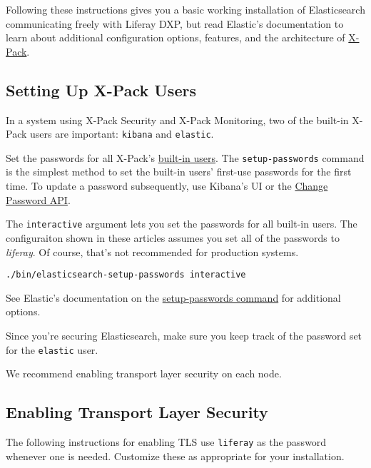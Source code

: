 Following these instructions gives you a basic working installation of
Elasticsearch communicating freely with Liferay DXP, but read Elastic's
documentation to learn about additional configuration options, features,
and the architecture of
\href{https://www.elastic.co/guide/en/elasticsearch/reference/6.5/configuring-security.html}{X-Pack}.

\subsection{Setting Up X-Pack Users}\label{setting-up-x-pack-users}

In a system using X-Pack Security and X-Pack Monitoring, two of the
built-in X-Pack users are important: \texttt{kibana} and
\texttt{elastic}.

Set the passwords for all X-Pack's
\href{https://www.elastic.co/guide/en/x-pack/current/setting-up-authentication.html\#built-in-users}{built-in
users}. The \texttt{setup-passwords} command is the simplest method to
set the built-in users' first-use passwords for the first time. To
update a password subsequently, use Kibana's UI or the
\href{https://www.elastic.co/guide/en/elasticsearch/reference/6.5/security-api-change-password.html}{Change
Password API}.

The \texttt{interactive} argument lets you set the passwords for all
built-in users. The configuraiton shown in these articles assumes you
set all of the passwords to \emph{liferay}. Of course, that's not
recommended for production systems.

\begin{verbatim}
./bin/elasticsearch-setup-passwords interactive
\end{verbatim}

See Elastic's documentation on the
\href{https://www.elastic.co/guide/en/elasticsearch/reference/6.5/setup-passwords.html}{setup-passwords
command} for additional options.

Since you're securing Elasticsearch, make sure you keep track of the
password set for the \texttt{elastic} user.

We recommend enabling transport layer security on each node.

\subsection{Enabling Transport Layer
Security}\label{enabling-transport-layer-security}

The following instructions for enabling TLS use \texttt{liferay} as the
password whenever one is needed. Customize these as appropriate for your
installation.

